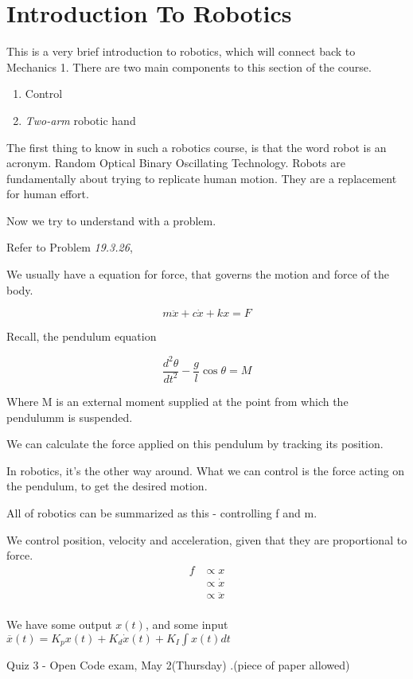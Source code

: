 \documentclass{report}
\begin{document}
\chapter{Introduction To Robotics}
This is a very brief introduction to robotics, which will connect back to Mechanics 1. 
There are two main components to this section of the course.
\begin{enumerate}
	\item Control
	\item \textit{Two-arm} robotic hand
\end{enumerate}

The first thing to know in such a robotics course, is that the word robot is an acronym. Random Optical Binary Oscillating Technology. Robots are fundamentally about trying to replicate human motion. They are a replacement for human effort. 
 
Now we try to understand with a problem.

Refer to Problem \textit{19.3.26},

We usually have a equation for force, that governs the motion and force of the body.

\[ 
	m\ddot{x} + c\dot{x} + kx = F
\]

Recall, the pendulum equation

\[ 
	\frac{d^2 \theta}{dt^2} - \frac{g}{l} \cos{\theta} = M
\]

Where M is an external moment supplied at the point from which the pendulumm is suspended.

We can calculate the force applied on this pendulum by tracking its position.

In robotics, it's the other way around. What we can control is the force acting on the pendulum, to get the desired motion.

All of robotics can be summarized as this - controlling f and m.

We control position, velocity and acceleration, given that they are proportional to force.
\begin{align*}
	f &\propto x \\
	  &\propto \dot{x} \\
	  &\propto \ddot{x} \\
\end{align*}

We have some output $x(t)$, and some input $\overline{x}(t) = K_p x(t) + K_d \dot{x}(t) + K_I \int x(t) dt$ 

\begin{note}
	Quiz 3 - Open Code exam, May 2(Thursday) .(piece of paper allowed)
\end{note}
\end{document}

